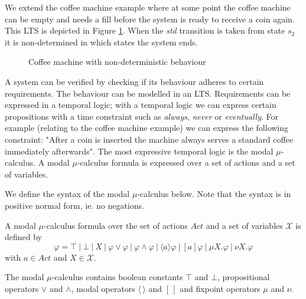 \begin{example}
	We extend the coffee machine example where at some point the coffee machine can be empty and needs a fill before the system is ready to receive a coin again. This LTS is depicted in Figure \ref{fig:coffeemachineundeterministic}. When the \textit{std} transition is taken from state $s_2$ it is non-determined in which states the system ends.
	\begin{figure}[h]
		\centering
		\caption[Coffee machine LTS]{Coffee machine with non-deterministic behaviour}
		\label{fig:coffeemachineundeterministic}
	\end{figure}
\end{example}


A system can be verified by checking if its behaviour adheres to certain requirements. The behaviour can be modelled in an LTS. Requirements can be expressed in a temporal logic; with a temporal logic we can express certain propositions with a time constraint such as \textit{always}, \textit{never} or \textit{eventually}. For example (relating to the coffee machine example) we can express the following constraint: "After a coin is inserted the machine always serves a standard coffee immediately afterwards". The most expressive temporal logic is the modal $\mu$-calculus. A modal $\mu$-calculus formula is expressed over a set of actions and a set of variables.

We define the syntax of the modal $\mu$-calculus below. Note that the syntax is in positive normal form, ie. no negations.
\begin{definition}
	\label{def_mu_syntax}
	A modal $\mu$-calculus formula over the set of actions $Act$ and a set of variables $\mathcal{X}$ is defined by
	\[ \varphi = \top\ |\ \bot\ |\ X\ |\ \varphi \vee \varphi\ |\ \varphi \wedge \varphi\ |\ \langle a \rangle \varphi\ |\ [a]\varphi\ |\ \mu X.\varphi\ |\ \nu X.\varphi \]
	with $a \in Act$ and $X \in \mathcal{X}$. 
\end{definition}
The modal $\mu$-calculus contains boolean constants $\top$ and $\bot$, propositional operators $\vee$ and $\wedge$, modal operators $\langle \, \rangle$ and $[ \, ]$ and fixpoint operators $\mu$ and $\nu$. 

